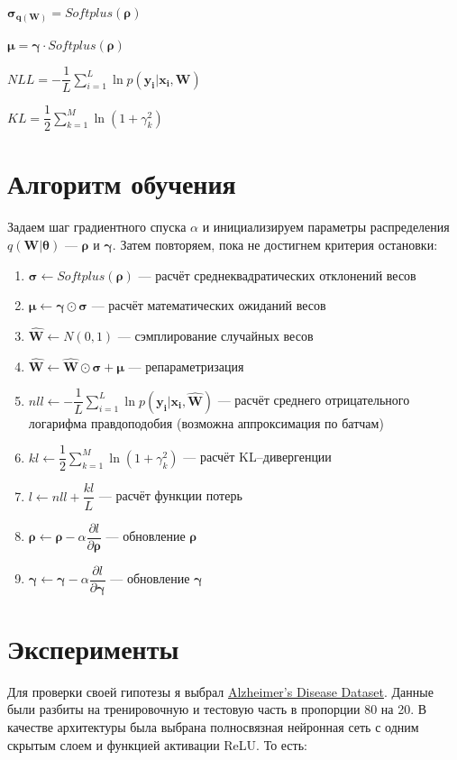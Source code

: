 \documentclass{article}
\begin{document}
$\pmb{\sigma_{q(\mathbf{W})}} = Softplus(\pmb{\rho})$

$\pmb{\mu} = \pmb{\gamma} \cdot Softplus(\pmb{\rho})$

$NLL = -\dfrac{1}{L}\sum_{i=1}^{L}{\ln{p( \mathbf{y_{i}} | \mathbf{x_{i}}, \mathbf{W})}}$

$KL = \dfrac{1}{2}\sum_{k=1}^{M}\ln({1 + \gamma_{k}^{2}})$

\section{Алгоритм обучения}
Задаем шаг градиентного спуска $\alpha$ и инициализируем параметры распределения $q(\mathbf{W} | \pmb{\theta})$ — $\pmb{\rho}$ и $\pmb{\gamma}$. Затем повторяем, пока не достигнем критерия остановки:
\begin{enumerate}
    \item $\pmb{\sigma} \leftarrow Softplus(\pmb{\rho})$ --- расчёт среднеквадратических отклонений весов
    \item $\pmb{\mu} \leftarrow \pmb{\gamma} \odot \pmb{\sigma}$ --- расчёт математических ожиданий весов
    \item $\hat{\mathbf{W}} \leftarrow N(0, 1)$ --- сэмплирование случайных весов
    \item $\hat{\mathbf{W}} \leftarrow \hat{\mathbf{W}} \odot \pmb{\sigma} + \pmb{\mu}$ --- репараметризация
    \item $nll \leftarrow -\dfrac{1}{L}\sum_{i=1}^{L}{\ln{p( \mathbf{y_{i}} | \mathbf{x_{i}}, \mathbf{\hat{W}})}}$ --- расчёт среднего отрицательного логарифма правдоподобия (возможна аппроксимация по батчам)
    \item $kl \leftarrow \dfrac{1}{2}\sum_{k=1}^{M}\ln({1 + \gamma_{k}^{2}})$ --- расчёт KL--дивергенции
    \item $l \leftarrow nll + \dfrac{kl}{L}$ --- расчёт функции потерь
    \item $\pmb{\rho} \leftarrow \pmb{\rho} - \alpha \dfrac{\partial l}{\partial \pmb{\rho}}$ --- обновление $\pmb{\rho}$
    \item $\pmb{\gamma} \leftarrow \pmb{\gamma} - \alpha \dfrac{\partial l}{\partial \pmb{\gamma}}$ --- обновление $\pmb{\gamma}$
\end{enumerate}

\section{Эксперименты}

Для проверки своей гипотезы я выбрал \href{https://www.kaggle.com/datasets/rabieelkharoua/alzheimers-disease-dataset}{Alzheimer's Disease Dataset}. Данные были разбиты на тренировочную и тестовую часть в пропорции 80 на 20. В качестве архитектуры была выбрана полносвязная нейронная сеть с одним скрытым слоем и функцией активации ReLU. То есть:
\end{document}

